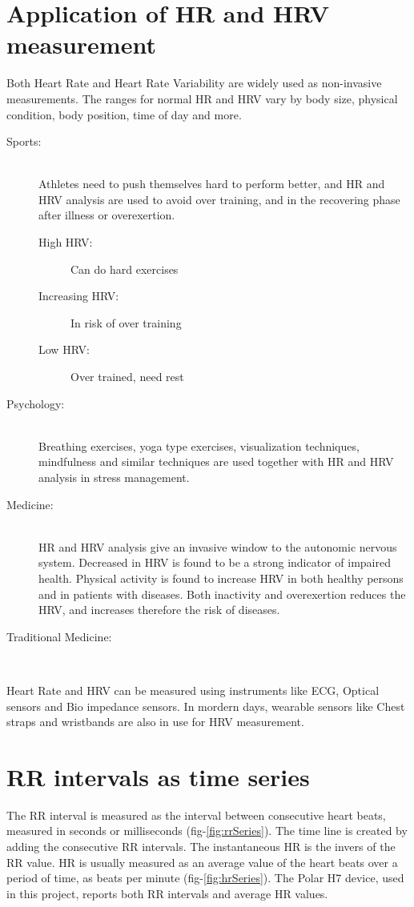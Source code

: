 \documentclass[a4paper, 11pt]{report}\usepackage[]{graphicx}\usepackage[]{color}
\numberwithin{figure}{section}
\begin{document}
\section{Application of HR and HRV measurement}
Both Heart Rate and Heart Rate Variability are widely used as non-invasive measurements. The ranges for normal HR and HRV vary by body size, physical condition, body position, time of day and more.
\begin{description}
\item [Sports:] \hfill \\
Athletes need to push themselves hard to perform better, and HR and HRV analysis are used to avoid over training, and in the recovering phase after illness or overexertion. 
\begin{description}
\item [High HRV:] Can do hard exercises
\item [Increasing HRV:] In risk of over training
\item [Low HRV:] Over trained, need rest
\end{description}
\item [Psychology:]\hfill \\ 
Breathing exercises, yoga type exercises, visualization techniques, mindfulness and similar techniques are used together with HR and HRV analysis in stress management. 
\item [Medicine:]\hfill \\ 
HR and HRV analysis give an invasive window to the autonomic nervous system. Decreased in HRV is found to be a strong indicator of impaired health. Physical activity is found to increase HRV in both healthy persons and in patients with diseases. Both inactivity and overexertion reduces the HRV, and increases therefore the risk of diseases.
\item [Traditional Medicine:]\hfill \\ 
\end{description}
Heart Rate and HRV can be measured using instruments like ECG, Optical sensors and Bio impedance sensors. In mordern days, wearable sensors like Chest straps and wristbands are also in use for HRV measurement.

\section{RR intervals as time series}
The RR interval is measured as the interval between consecutive heart beats, measured in seconds or milliseconds (fig-\ref{fig:rrSeries}). The time line is created by adding the consecutive RR intervals. The instantaneous HR is the invers of the RR value. HR is usually measured as an average value of the heart beats over a period of time, as beats per minute (fig-\ref{fig:hrSeries}). The Polar H7 device, used in this project, reports both RR intervals and average HR values. 
\end{document}

